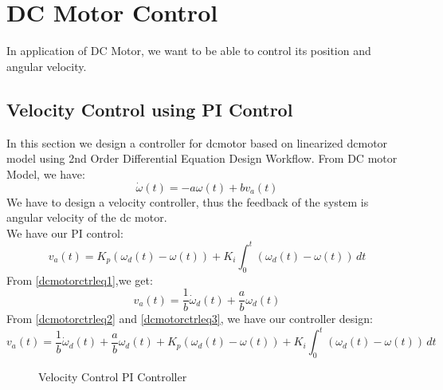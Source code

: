 \chapter{DC Motor Control}
In application of DC Motor, we want to be able to control its position and angular velocity.

\section{Velocity Control using PI Control}
In this section we design a controller for dcmotor based on linearized dcmotor model using 2nd Order Differential Equation Design Workflow. From DC motor Model, we have:
\begin{equation}
	\label{dcmotorctrleq1}
	\dot{\omega}(t) = -a\omega(t) + bv_a(t) 	
\end{equation}
We have to design a velocity controller, thus the feedback of the system is angular velocity of the dc motor.\\
We have our PI control:
\begin{equation}
	\label{dcmotorctrleq2}
	v_a(t) = K_p(\omega_d(t) - \omega(t)) + K_i \int_{0}^{t} (\omega_d(t) - \omega(t)) \,dt
\end{equation}
From \autoref{dcmotorctrleq1},we get:
\begin{equation}
	\label{dcmotorctrleq3}
	v_a(t) = \frac{1}{b}\dot{\omega}_d(t) + \frac{a}{b}\omega_d(t)
\end{equation}
From \autoref{dcmotorctrleq2} and \autoref{dcmotorctrleq3}, we have our controller design:
\begin{equation}
	\label{dcmotorctrleq4}
	v_a(t) = \frac{1}{b}\dot{\omega}_d(t) + \frac{a}{b}\omega_d(t) + K_p(\omega_d(t) - \omega(t)) + K_i \int_{0}^{t} (\omega_d(t) - \omega(t)) \,dt
\end{equation}

\begin{figure}[h]
	\centering
	
	\caption{Velocity Control PI Controller}
	\label{fig:Velocity Control PI Controller}
\end{figure}

